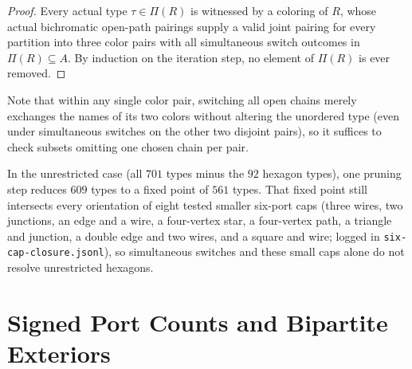 \documentclass[11pt]{article}
\begin{document}
\begin{proof}
Every actual type $\tau \in \Pi(R)$ is witnessed by a coloring of $R$, whose actual
bichromatic open-path pairings supply a valid joint pairing for every partition into
three color pairs with all simultaneous switch outcomes in $\Pi(R) \subseteq A$. By
induction on the iteration step, no element of $\Pi(R)$ is ever removed.
\end{proof}

Note that within any single color pair, switching all open chains merely exchanges the
names of its two colors without altering the unordered type (even under simultaneous
switches on the other two disjoint pairs), so it suffices to check subsets omitting one
chosen chain per pair.

In the unrestricted case (all $701$ types minus the $92$ hexagon types), one pruning step
reduces $609$ types to a fixed point of $561$ types. That fixed point still intersects
every orientation of eight tested smaller six-port caps (three wires, two junctions, an
edge and a wire, a four-vertex star, a four-vertex path, a triangle and junction, a
double edge and two wires, and a square and wire; logged in
\texttt{six-cap-closure.jsonl}), so simultaneous switches and these small caps alone do
not resolve unrestricted hexagons.

\section{Signed Port Counts and Bipartite Exteriors}
\end{document}

